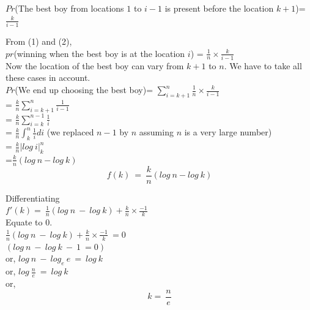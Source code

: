 \documentclass{llncs}
\begin{document}
$Pr$(The best boy from locations $1$ to $i-1$ is present before the location $k+1$)= $\frac{k}{i-1}$

From (1) and (2), \\
$pr$(winning when the best boy is at the location $i$) = $\frac{1}{n} \times \frac{k}{i-1}$\\

Now the location of the best boy can vary from $k+1$ to $n$. We have to take all these cases in account. \\

$Pr$(We end up choosing the best boy)= $\sum_{i=k+1}^n \frac{1}{n} \times \frac{k}{i-1}$\\

= $\frac{k}{n} \sum_{i=k+1}^n \frac{1}{i-1}$\\

= $\frac{k}{n} \sum_{i=k}^{n-1} \frac{1}{i}$\\

= $\frac{k}{n} \int_{k}^{n} \frac{1}{i} di$ (we replaced $n-1$ by $n$ assuming $n$ is a very large number)\\

= $\frac{k}{n}|log\ i|_{k}^{n}$\\

=$\frac{k}{n} (log\ n - log\ k)$\\

\[
 \boxed{f(k)\ =\ \frac{k}{n} (log\ n - log\ k)}
 \]
 
 Differentiating \\
 
 $f'(k)=\ \frac{1}{n} (log\ n\ -\ log\ k) + \frac{k}{n} \times \frac{-1}{k}$\\
 
 Equate to $0$. \\
 
 $\frac{1}{n} (log\ n\ -\ log\ k) + \frac{k}{n} \times \frac{-1}{k}\ =0$\\
 
 $ (log\ n\ -\ log\ k\ -\ 1\ = 0)$\\
 
 or, $log\ n\ -\ log_e\ e\ =\ log\ k$\\
 
 or, $log\ \frac{n}{e}\ =\ log\ k$\\
 
 or, 
\[
 \boxed{k=\ \frac{n}{e}}
 \]
\end{document}

